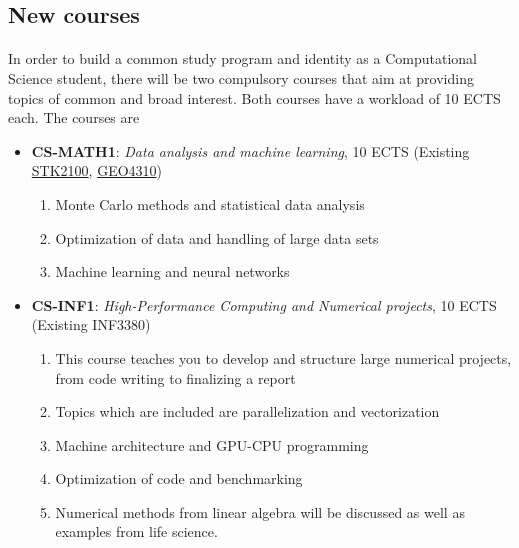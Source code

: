 \documentclass[%
oneside,                 %
final,                   %
10pt]{article}
\begin{document}
\noindent



\subsection{New courses}

\paragraph{}
In order to build a common study program and identity as a Computational Science student, there will be two compulsory courses that aim at providing topics of common and broad interest.
Both courses have a workload of 10 ECTS each. The courses are

\begin{itemize}
\item \textbf{CS-MATH1}: \emph{Data analysis and machine learning}, 10 ECTS (Existing \href{{http://www.uio.no/studier/emner/matnat/math/STK2100/}}{STK2100}, \href{{http://www.uio.no/studier/emner/matnat/geofag/GEO4310/}}{GEO4310})
\begin{enumerate}

 \item Monte Carlo methods and statistical data analysis

 \item Optimization of data and handling of large data sets

 \item Machine learning and neural networks

\end{enumerate}

\noindent
\item \textbf{CS-INF1}: \emph{High-Performance Computing and Numerical projects}, 10 ECTS (Existing INF3380)
\begin{enumerate}

 \item This course teaches you to develop and structure large numerical projects, from code writing to  finalizing a report

 \item Topics which are included are parallelization and vectorization

 \item Machine architecture and GPU-CPU programming

 \item Optimization of code and benchmarking

 \item Numerical methods from linear algebra will be discussed as well as examples from life science.
\end{enumerate}

\noindent
\end{itemize}
\end{document}
